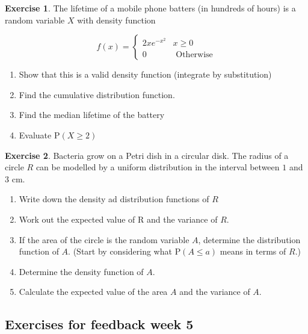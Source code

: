 \documentclass[
]{book}
\theoremstyle{definition}
\theoremstyle{definition}
\theoremstyle{definition}
\newtheorem{exercise}{Exercise}[chapter]
\theoremstyle{definition}
\theoremstyle{remark}
\begin{document}
\begin{exercise}

The lifetime of a mobile phone batters (in hundreds of hours) is a random variable \(X\) with density function

\begin{equation*}
  f(x)=\begin{cases}
        2xe^{-x^2} &  x \geq 0 \\
        0 &  \text{     Otherwise}
  \end{cases}
\end{equation*}

\begin{enumerate}
\def\labelenumi{\alph{enumi})}
\item
  Show that this is a valid density function (integrate by substitution)
\item
  Find the cumulative distribution function.
\item
  Find the median lifetime of the battery
\item
  Evaluate \(\text{P}(X\geq 2)\)
\end{enumerate}

\end{exercise}

\begin{exercise}

Bacteria grow on a Petri dish in a circular disk. The radius of a circle \(R\) can be modelled by a uniform distribution in the interval between \(1\) and \(3\) cm.

\begin{enumerate}
\def\labelenumi{\alph{enumi})}
\item
  Write down the density ad distribution functions of \(R\)
\item
  Work out the expected value of R and the variance of \(R\).
\item
  If the area of the circle is the random variable \(A\), determine the distribution function of \(A\).
  (Start by considering what \(\text{P}(A\leq a)\) means in terms of \(R\).)
\item
  Determine the density function of \(A\).
\item
  Calculate the expected value of the area \(A\) and the variance of \(A\).
\end{enumerate}

\end{exercise}

\hypertarget{exercises-for-feedback-week-5}{%
\subsection{Exercises for feedback week 5}\label{exercises-for-feedback-week-5}}
\end{document}
